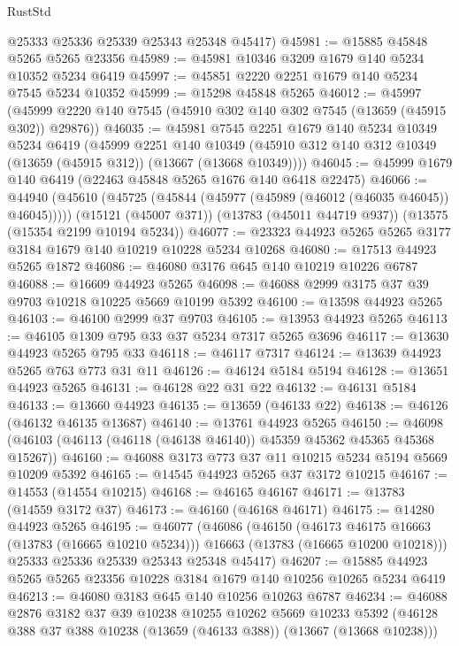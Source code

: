 \begin{lexlean}{RustStd}
\begin{coremodule}
      @25333
      @25336
      @25339
      @25343
      @25348
      @45417)
@45981 := @15885 @45848 @5265 @5265 @23356
@45989 := @45981 @10346 @3209 @1679 @140 @5234 @10352 @5234 @6419
@45997 := @45851 @2220 @2251 @1679 @140 @5234 @7545 @5234 @10352
@45999 := @15298 @45848 @5265
@46012 := @45997
    (@45999 @2220 @140 @7545 (@45910 @302 @140 @302 @7545 (@13659 (@45915 @302)) @29876))
@46035 := @45981
    @7545
    @2251
    @1679
    @140
    @5234
    @10349
    @5234
    @6419
    (@45999
      @2251
      @140
      @10349
      (@45910 @312 @140 @312 @10349 (@13659 (@45915 @312)) (@13667 (@13668 @10349))))
@46045 := @45999 @1679 @140 @6419 (@22463 @45848 @5265 @1676 @140 @6418 @22475)
@46066 := @44940
    (@45610 (@45725 (@45844 (@45977 (@45989 (@46012 (@46035 @46045)) @46045)))))
    (@15121 (@45007 @371))
    (@13783 (@45011 @44719 @937))
    (@13575 (@15354 @2199 @10194 @5234))
@46077 := @23323 @44923 @5265 @5265 @3177 @3184 @1679 @140 @10219 @10228 @5234 @10268
@46080 := @17513 @44923 @5265 @1872
@46086 := @46080 @3176 @645 @140 @10219 @10226 @6787
@46088 := @16609 @44923 @5265
@46098 := @46088 @2999 @3175 @37 @39 @9703 @10218 @10225 @5669 @10199 @5392
@46100 := @13598 @44923 @5265
@46103 := @46100 @2999 @37 @9703
@46105 := @13953 @44923 @5265
@46113 := @46105 @1309 @795 @33 @37 @5234 @7317 @5265 @3696
@46117 := @13630 @44923 @5265 @795 @33
@46118 := @46117 @7317
@46124 := @13639 @44923 @5265 @763 @773 @31 @11
@46126 := @46124 @5184 @5194
@46128 := @13651 @44923 @5265
@46131 := @46128 @22 @31 @22
@46132 := @46131 @5184
@46133 := @13660 @44923
@46135 := @13659 (@46133 @22)
@46138 := @46126 (@46132 @46135 @13687)
@46140 := @13761 @44923 @5265
@46150 := @46098 (@46103 (@46113 (@46118 (@46138 @46140)) @45359 @45362 @45365 @45368 @15267))
@46160 := @46088 @3173 @773 @37 @11 @10215 @5234 @5194 @5669 @10209 @5392
@46165 := @14545 @44923 @5265 @37 @3172 @10215
@46167 := @14553 (@14554 @10215)
@46168 := @46165 @46167
@46171 := @13783 (@14559 @3172 @37)
@46173 := @46160 (@46168 @46171)
@46175 := @14280 @44923 @5265
@46195 := @46077
    (@46086
      (@46150
        (@46173 @46175 @16663 (@13783 (@16665 @10210 @5234)))
        @16663
        (@13783 (@16665 @10200 @10218)))
      @25333
      @25336
      @25339
      @25343
      @25348
      @45417)
@46207 := @15885 @44923 @5265 @5265 @23356 @10228 @3184 @1679 @140 @10256 @10265 @5234 @6419
@46213 := @46080 @3183 @645 @140 @10256 @10263 @6787
@46234 := @46088
    @2876
    @3182
    @37
    @39
    @10238
    @10255
    @10262
    @5669
    @10233
    @5392
    (@46128 @388 @37 @388 @10238 (@13659 (@46133 @388)) (@13667 (@13668 @10238)))

\end{coremodule}
\end{lexlean}

